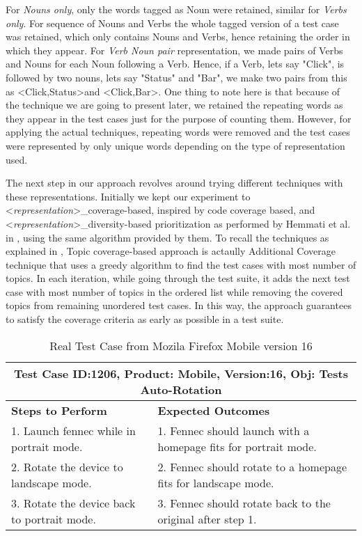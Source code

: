 \documentclass[conference]{IEEEtran}
\begin{document}
For \textit{Nouns only}, only the words tagged as Noun were retained, similar for \textit{Verbs only}. For sequence of Nouns and Verbs the whole tagged version of a test case was retained, which only contains Nouns and Verbs, hence retaining the order in which they appear. For \textit{Verb Noun pair} representation, we made pairs of Verbs and Nouns for each Noun following a Verb. Hence, if a Verb, lets say "Click", is followed by two nouns, lets say "Status" and "Bar", we make two pairs from this as \textless Click,Status\textgreater and \textless Click,Bar\textgreater. One thing to note here is that because of the technique we are going to present later, we retained the repeating words as they appear in the test cases just for the purpose of counting them. However, for applying the actual techniques, repeating words were removed and the test cases were represented by only unique words depending on the type of representation used.
\par
The next step in our approach revolves around trying different techniques with these representations. Initially we kept our experiment to \textless \textit{representation}\textgreater  \_coverage-based, inspired by code coverage based, and \textless \textit{representation}\textgreater \_diversity-based prioritization as performed by Hemmati et al. in \cite{hemmati2015prioritization}, using the same algorithm provided by them. To recall the techniques as explained in \cite{hemmati2015prioritization}, Topic coverage-based approach is actaully Additional Coverage technique that uses a greedy algorithm to find the test cases with most number of topics. In each iteration, while going through the test suite, it adds the next test case with most number of topics in the ordered list while removing the covered topics from remaining unordered test cases. In this way, the approach guarantees to satisfy the coverage criteria as early as possible in a test suite. 

\begin{table}[!t]
\centering
\caption{Real Test Case from Mozila Firefox Mobile version 16 }
\begin{tabular}{ ||p{3.5cm}|p{3.5cm}||  }
 \hline
 \multicolumn{2}{|c|}{\centering Test Case ID:1206, Product: Mobile, Version:16, Obj: Tests Auto-Rotation} \\
 \hline
 \hline
 \textbf{Steps to Perform}   & \textbf{Expected Outcomes} \\
 \hline
 1. Launch fennec while in portrait mode. & 1. Fennec should launch with a homepage fits for portrait mode. \\
 \hline
 2. Rotate the device to landscape mode. & 2. Fennec should rotate to a homepage fits for landscape mode. \\
 \hline
 3. Rotate the device back to portrait mode. & 3. Fennec should rotate back to the original after step 1.\\
 \hline
\end{tabular}
\label{table:1}
\end{table}
\end{document}
